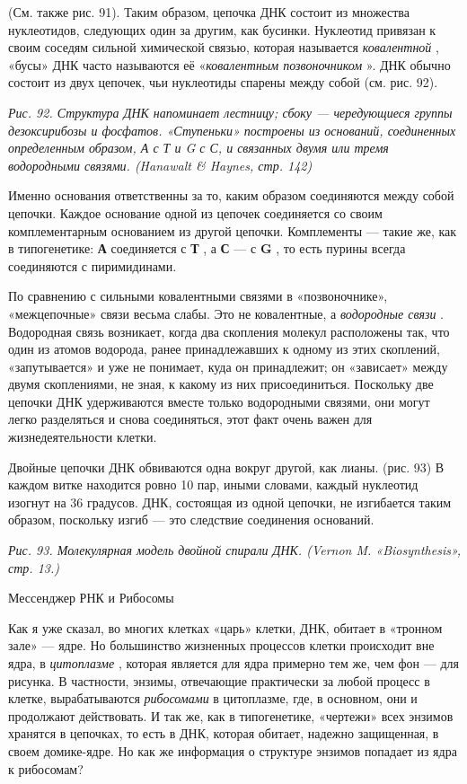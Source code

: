 \documentclass[../main.tex]{subfiles}
\begin{document}
(См. также рис. 91). Таким образом, цепочка ДНК состоит из множества нуклеотидов, следующих один за другим, как бусинки. Нуклеотид привязан к своим соседям сильной химической связью, которая называется \emph{ковалентной} , «бусы» ДНК часто называются её «\emph{ковалентным позвоночником} ». ДНК обычно состоит из двух цепочек, чьи нуклеотиды спарены между собой (см. рис. 92).

\emph{Рис. 92. Структура ДНК напоминает лестницу; сбоку --- чередующиеся группы дезоксирибозы и фосфатов. «Ступеньки» построены из оснований, соединенных определенным образом, А с Т и G с С, и связанных двумя или тремя водородными связями. (Hanawalt \& Haynes, стр. 142)}

Именно основания ответственны за то, каким образом соединяются между собой цепочки. Каждое основание одной из цепочек соединяется со своим комплементарным основанием из другой цепочки. Комплементы --- такие же, как в типогенетике: \textbf{А} соединяется с \textbf{Т} , а \textbf{С} --- с \textbf{G} , то есть пурины всегда соединяются с пиримидинами.

По сравнению с сильными ковалентными связями в «позвоночнике», «межцепочные» связи весьма слабы. Это не ковалентные, а \emph{водородные связи} . Водородная связь возникает, когда два скопления молекул расположены так, что один из атомов водорода, ранее принадлежавших к одному из этих скоплений, «запутывается» и уже не понимает, куда он принадлежит; он «зависает» между двумя скоплениями, не зная, к какому из них присоединиться. Поскольку две цепочки ДНК удерживаются вместе только водородными связями, они могут легко разделяться и снова соединяться, этот факт очень важен для жизнедеятельности клетки.

Двойные цепочки ДНК обвиваются одна вокруг другой, как лианы. (рис. 93) В каждом витке находится ровно 10 пар, иными словами, каждый нуклеотид изогнут на 36 градусов. ДНК, состоящая из одной цепочки, не изгибается таким образом, поскольку изгиб --- это следствие соединения оснований.

\emph{Рис. 93. Молекулярная модель двойной спирали ДНК\@. (Vernon M. «Biosynthesis», стр. 13.)}

Мессенджер РНК и Рибосомы

Как я уже сказал, во многих клетках «царь» клетки, ДНК, обитает в «тронном зале» --- ядре. Но большинство жизненных процессов клетки происходит вне ядра, в \emph{цитоплазме} , которая является для ядра примерно тем же, чем фон --- для рисунка. В частности, энзимы, отвечающие практически за любой процесс в клетке, вырабатываются \emph{рибосомами} в цитоплазме, где, в основном, они и продолжают действовать. И так же, как в типогенетике, «чертежи» всех энзимов хранятся в цепочках, то есть в ДНК, которая обитает, надежно защищенная, в своем домике-ядре. Но как же информация о структуре энзимов попадает из ядра к рибосомам?
\end{document}
